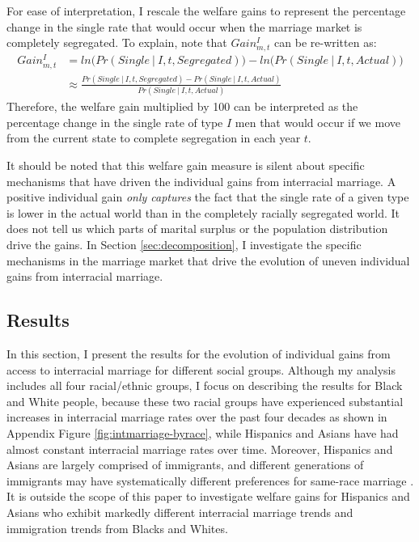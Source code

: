 For ease of interpretation, I rescale the welfare gains to represent the percentage change in the single rate that would occur when the marriage market is completely segregated. To explain, note that $Gain^I_{m,t}$ can be re-written as:
\begin{align*}
	Gain^{I}_{m,t} &= ln \Big( Pr( Single \: |  \: I, t, Segregated ) \Big) - ln \Big( Pr( Single  \: |  \: I, t, Actual ) \Big) \\[3pt] 
	&\approx  \frac{ Pr( Single \: |  \: I, t, Segregated )  - Pr( Single  \: |  \: I, t, Actual ) }{Pr( Single  \: |  \: I, t, Actual ) }
\end{align*}
Therefore, the welfare gain multiplied by 100 can be interpreted as the percentage change in the single rate of type $I$ men that would occur if we move from the current state to complete segregation in each year $t$. 


 It should be noted that this welfare gain measure is silent about specific mechanisms that have driven the individual gains from interracial marriage. A positive individual gain \textit{only captures} the fact that the single rate of a given type is lower in the actual world than in the completely racially segregated world. It does not tell us which parts of marital surplus or the population distribution drive the gains. In Section \ref{sec:decomposition}, I investigate the specific mechanisms in the marriage market that drive the evolution of uneven individual gains from interracial marriage. 


\subsection{Results} \label{sec:gains-results}

In this section, I present the results for the evolution of individual gains from access to interracial marriage for different social groups. Although my analysis includes all four racial/ethnic groups, I focus on describing the results for Black and White people, because these two racial groups have experienced substantial increases in interracial marriage rates over the past four decades as shown in Appendix Figure  \ref{fig:intmarriage-byrace}, while Hispanics and Asians have had almost constant interracial marriage rates over time. Moreover, Hispanics and Asians are largely comprised of immigrants, and different generations of immigrants may have systematically different preferences for same-race marriage \citep{LichterCarmaltQian_2011_HispanicInterracialMarriage, furtado_2015}. It is outside the scope of this paper to investigate welfare gains for Hispanics and Asians who exhibit markedly different interracial marriage trends and immigration trends from Blacks and Whites.

